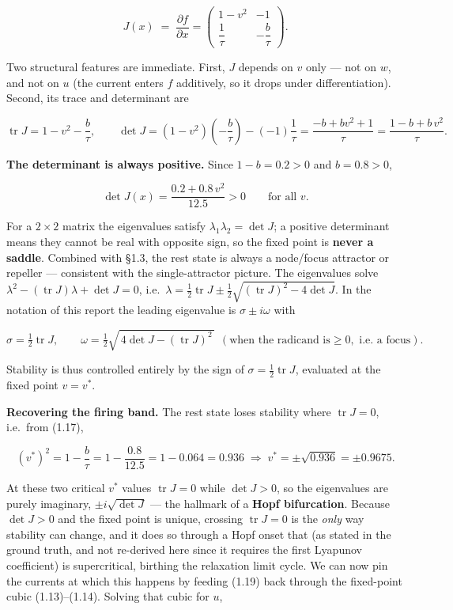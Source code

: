 \documentclass[
  11pt,
]{article}
\providecommand{\gt}{>}
\begin{document}
\[
J(x)\;=\;\frac{\partial f}{\partial x}
=\begin{pmatrix}
1-v^{2} & -1\\[6pt]
\dfrac{1}{\tau} & -\dfrac{b}{\tau}
\end{pmatrix}.
\tag{1.16}
\]

Two structural features are immediate. First, \(J\) depends on \(v\)
only --- not on \(w\), and not on \(u\) (the current enters \(f\)
additively, so it drops under differentiation). Second, its trace and
determinant are

\[
\operatorname{tr}J = 1-v^{2}-\frac{b}{\tau},
\qquad
\det J = (1-v^{2})\!\left(-\frac{b}{\tau}\right)-(-1)\frac{1}{\tau}
=\frac{-b+bv^{2}+1}{\tau}=\frac{1-b+b\,v^{2}}{\tau}.
\tag{1.17}
\]

\textbf{The determinant is always positive.} Since \(1-b=0.2\gt 0\) and
\(b=0.8\gt 0\),

\[
\det J(x)=\frac{0.2+0.8\,v^{2}}{12.5}\gt 0\qquad\text{for all }v .
\tag{1.18}
\]

For a \(2\times2\) matrix the eigenvalues satisfy
\(\lambda_1\lambda_2=\det J\); a positive determinant means they cannot
be real with opposite sign, so the fixed point is \textbf{never a
saddle}. Combined with §1.3, the rest state is always a node/focus
attractor or repeller --- consistent with the single-attractor picture.
The eigenvalues solve
\(\lambda^2-(\operatorname{tr}J)\lambda+\det J=0\),
i.e.~\(\lambda=\tfrac12\operatorname{tr}J\pm\tfrac12\sqrt{(\operatorname{tr}J)^2-4\det J}\).
In the notation of this report the leading eigenvalue is
\(\sigma\pm i\omega\) with

\[
\sigma=\tfrac12\operatorname{tr}J,\qquad
\omega=\tfrac12\sqrt{\,4\det J-(\operatorname{tr}J)^2\,}\ \ (\text{when the radicand is}\ge 0,\text{ i.e. a focus}).
\]

Stability is thus controlled entirely by the sign of
\(\sigma=\tfrac12\operatorname{tr}J\), evaluated at the fixed point
\(v=v^\ast\).

\textbf{Recovering the firing band.} The rest state loses stability
where \(\operatorname{tr}J=0\), i.e.~from (1.17),

\[
(v^\ast)^{2}=1-\frac{b}{\tau}=1-\frac{0.8}{12.5}=1-0.064=0.936
\;\Longrightarrow\;
v^\ast=\pm\sqrt{0.936}=\pm0.9675 .
\tag{1.19}
\]

At these two critical \(v^\ast\) values \(\operatorname{tr}J=0\) while
\(\det J\gt 0\), so the eigenvalues are purely imaginary,
\(\pm i\sqrt{\det J}\) --- the hallmark of a \textbf{Hopf bifurcation}.
Because \(\det J\gt 0\) and the fixed point is unique, crossing
\(\operatorname{tr}J=0\) is the \emph{only} way stability can change,
and it does so through a Hopf onset that (as stated in the ground truth,
and not re-derived here since it requires the first Lyapunov
coefficient) is supercritical, birthing the relaxation limit cycle. We
can now pin the currents at which this happens by feeding (1.19) back
through the fixed-point cubic (1.13)--(1.14). Solving that cubic for
\(u\),
\end{document}
